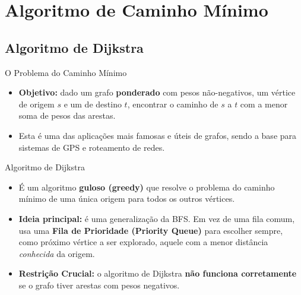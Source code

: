 \documentclass[xcolor=table]{beamer}
\begin{document}
\section{Algoritmo de Caminho Mínimo}

\subsection{Algoritmo de Dijkstra}
\begin{frame}{O Problema do Caminho Mínimo}
  \begin{itemize}
    \item \textbf{Objetivo:} dado um grafo \textbf{ponderado} com pesos não-negativos, um vértice de origem $s$ e um de destino $t$, encontrar o caminho de $s$ a $t$ com a menor soma de pesos das arestas.
    \item Esta é uma das aplicações mais famosas e úteis de grafos, sendo a base para sistemas de GPS e roteamento de redes.
  \end{itemize}
  \begin{block}{Algoritmo de Dijkstra}
    \begin{itemize}
      \item É um algoritmo \textbf{guloso (greedy)} que resolve o problema do caminho mínimo de uma única origem para todos os outros vértices.
      \item \textbf{Ideia principal:} é uma generalização da BFS. Em vez de uma fila comum, usa uma \textbf{Fila de Prioridade (Priority Queue)} para escolher sempre, como próximo vértice a ser explorado, aquele com a menor distância \textit{conhecida} da origem.
      \item \textbf{Restrição Crucial:} o algoritmo de Dijkstra \textbf{não funciona corretamente} se o grafo tiver arestas com pesos negativos.
    \end{itemize}
  \end{block}
\end{frame}
\end{document}
